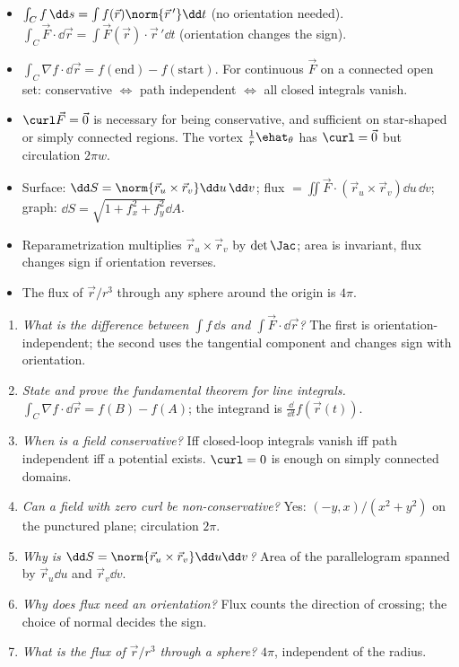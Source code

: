 \begin{summarybox}
\begin{itemize}
  \item $\int_Cf\,\dd s=\int f(\vec r)\norm{\vec r\,'}\dd t$ (no orientation needed). $\int_C\vec F\cdot\dd\vec r=\int\vec F(\vec r)\cdot\vec r\,'\dd t$ (orientation changes the sign).
  \item $\int_C\nabla f\cdot\dd\vec r=f(\text{end})-f(\text{start})$. For continuous $\vec F$ on a connected open set: conservative $\Leftrightarrow$ path independent $\Leftrightarrow$ all closed integrals vanish.
  \item $\curl\vec F=\vec 0$ is necessary for being conservative, and sufficient on star-shaped or simply connected regions. The vortex $\frac1r\ehat_\theta$ has $\curl=\vec 0$ but circulation $2\pi w$.
  \item Surface: $\dd S=\norm{\vec r_u\times\vec r_v}\dd u\,\dd v$; flux $=\iint\vec F\cdot(\vec r_u\times\vec r_v)\dd u\,\dd v$; graph: $\dd S=\sqrt{1+f_x^2+f_y^2}\dd A$.
  \item Reparametrization multiplies $\vec r_u\times\vec r_v$ by $\det\Jac$; area is invariant, flux changes sign if orientation reverses.
  \item The flux of $\vec r/r^3$ through any sphere around the origin is $4\pi$.
\end{itemize}
\end{summarybox}

\begin{interview}
\begin{enumerate}
  \item \emph{What is the difference between $\int f\,\dd s$ and $\int\vec F\cdot\dd\vec r$?} The first is orientation-independent; the second uses the tangential component and changes sign with orientation.
  \item \emph{State and prove the fundamental theorem for line integrals.} $\int_C\nabla f\cdot\dd\vec r=f(B)-f(A)$; the integrand is $\frac{\dd}{\dd t}f(\vec r(t))$.
  \item \emph{When is a field conservative?} Iff closed-loop integrals vanish iff path independent iff a potential exists. $\curl=0$ is enough on simply connected domains.
  \item \emph{Can a field with zero curl be non-conservative?} Yes: $(-y,x)/(x^2+y^2)$ on the punctured plane; circulation $2\pi$.
  \item \emph{Why is $\dd S=\norm{\vec r_u\times\vec r_v}\dd u\dd v$?} Area of the parallelogram spanned by $\vec r_u\dd u$ and $\vec r_v\dd v$.
  \item \emph{Why does flux need an orientation?} Flux counts the direction of crossing; the choice of normal decides the sign.
  \item \emph{What is the flux of $\vec r/r^3$ through a sphere?} $4\pi$, independent of the radius.
\end{enumerate}
\end{interview}

